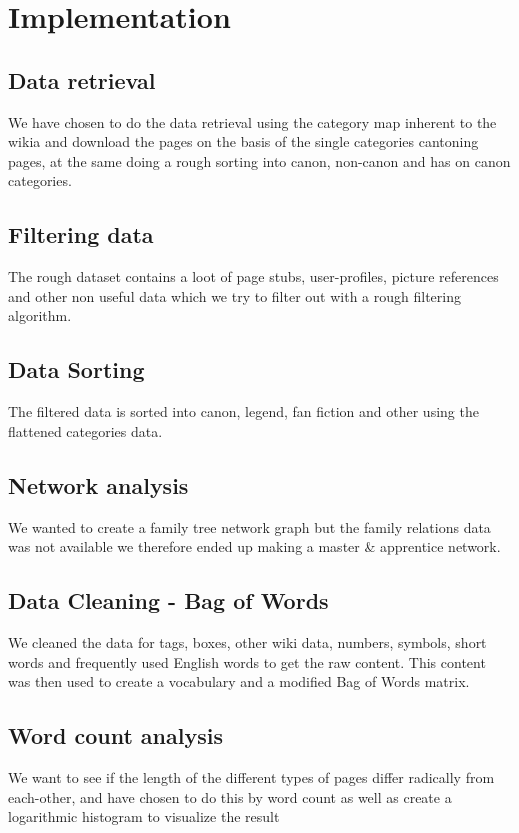 \section{Implementation}
\subsection{Data retrieval}
We have chosen to do the data retrieval using the category map inherent to the wikia and download the pages on the basis of the single categories cantoning pages, at the same doing a rough sorting into canon, non-canon and has on canon categories.

\subsection{Filtering data}
The rough dataset contains a loot of page stubs, user-profiles, picture references and other non useful data which we try to filter out with a rough filtering algorithm.

\subsection{Data Sorting}
The filtered data is sorted into canon, legend, fan fiction and other using the flattened categories data.

\subsection{Network analysis}
We wanted to create a family tree network graph but the family relations data was not available we therefore ended up making a master \& apprentice network.

\subsection{Data Cleaning - Bag of Words}
We cleaned the data for tags, boxes, other wiki data, numbers, symbols, short words and frequently used English words to get the raw content. This content was then used to create a vocabulary and a modified Bag of Words matrix.

\subsection{Word count analysis}
We want to see if the length of the different types of pages differ radically from each-other, and have chosen to do this by word count as well as create a logarithmic histogram to visualize the result 

